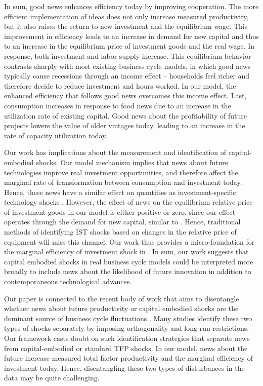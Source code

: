 \documentclass[12pt]{article}
\renewcommand{\cite}{\citet}
\begin{document}
In sum, good news  enhances efficiency today by  improving cooperation. The more efficient implementation of ideas does not only increase measured productivity, but it also raises the return to new investment and the equilibrium wage. This improvement in efficiency leads to an increase in demand for new capital and thus to an increase in the equilibrium price of investment goods and the real wage. In response, both investment and labor supply increase. This equilibrium behavior contrasts sharply with most existing business cycle models, in which good news typically cause recessions through an income effect -- households feel richer and therefore decide to reduce investment and hours worked. In our model, the enhanced efficiency that follows good news overcomes this income effect. Last, consumption increases in response to food news due to an increase in the utilization rate of existing capital. Good news about the profitability of future projects  lowers the value of older vintages today, leading to an increase in the rate of capacity utilization today.

Our work has implications about the measurement and identification of capital-embodied shocks. Our model mechanism implies that news about future technologies improve real investment opportunities, and therefore affect the marginal rate of transformation between consumption and investment today. Hence, these news have a similar effect on quantities as investment-specific technology shocks \citep{Solow1960,GHH1988,GHK1997,F2006,JPT2010,P2008}. However, the effect of news on the equilibrium relative price of investment goods in our model is either positive or zero, since our effect operates through the demand for new capital, similar to \cite{CMR2013}. Hence, traditional methods of identifying IST shocks based on changes in the relative price of equipment will miss this channel. Our work thus provides a micro-foundation for the marginal efficiency of investment shock in \cite{Justiniano2011}. In sum, our work suggests that capital embodied shocks in real business cycle models   could be interpreted more broadly to include news about   the likelihood of future innovation in addition to contemporaneous technological advances.


Our paper is connected to the recent body of work that aims to disentangle whether news about future productivity or capital embodied shocks are the dominant source of business cycle fluctuations \citep{BP2006,BP2009,F2009,BS2011,SGU2012}. Many studies identify these two types of shocks separately by imposing orthogonality and long-run restrictions. Our framework casts doubt on such identification strategies that separate news from capital-embodied or standard TFP shocks. In our model, news about the future increase measured total factor productivity and the marginal efficiency of investment today. Hence, disentangling these two types of disturbances in the data may be quite challenging. 
\end{document}

